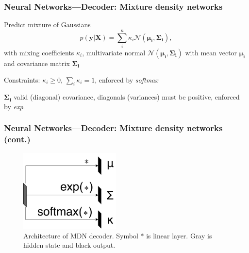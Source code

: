 \documentclass{beamer}
\begin{document}
\begin{frame}
  \frametitle{Neural Networks---Decoder: Mixture density networks}
  Predict mixture of Gaussians
\begin{equation*}
p \left( \bm{y} | \bm{X} \right) = \sum_{i}^n \kappa_i \mathcal{N} \left( \bm{\mu_i}, \bm{\Sigma_i} \right),
\end{equation*}
with mixing coefficients $\kappa_i$, multivariate normal $\mathcal{N} \left(\bm{\mu_i}, \bm{\Sigma_i}\right)$ with mean vector $\bm{\mu_i}$ and covariance matrix $\bm{\Sigma_i}$
  
Constraints:
$\kappa_i  \geq 0,\, \sum_i \kappa_i = 1$, enforced by \textit{softmax}

$\bm{\Sigma_i}$ valid (diagonal) covariance, diagonals (variances) must be positive, enforced by \textit{exp}.
\end{frame}

\begin{frame}
  \frametitle{Neural Networks---Decoder: Mixture density networks (cont.)}
  \begin{figure}[h]
    \centering
    \includegraphics[width=0.45\textwidth]{mdn_decoder}
    \caption*{Architecture of \textsc{MDN} decoder. Symbol $\ast$ is linear layer. Gray is hidden state and black output.}
  \end{figure}

\end{frame}
\end{document}
